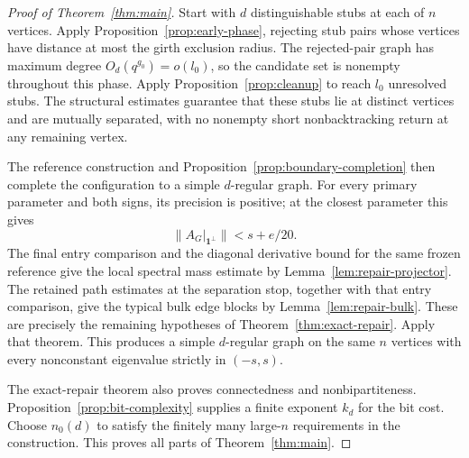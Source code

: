 \begin{proof}[Proof of Theorem~\ref{thm:main}]
Start with $d$ distinguishable stubs at each of $n$ vertices.  Apply
Proposition~\ref{prop:early-phase}, rejecting stub
pairs whose vertices have distance at most the girth exclusion radius.
The rejected-pair graph has maximum degree $O_d(q^{g_0})=o(l_0)$, so the
candidate set is nonempty throughout this phase.  Apply
Proposition~\ref{prop:cleanup} to reach $l_0$ unresolved stubs.  The structural estimates guarantee that
these stubs lie at distinct vertices and are mutually separated, with
no nonempty short nonbacktracking return at any remaining vertex.

The reference construction and Proposition~\ref{prop:boundary-completion} then complete the
configuration to a simple $d$-regular graph.  For every primary parameter
and both signs, its precision is positive; at the closest parameter this
gives
\[
 \|A_G|_{\mathbf1^\perp}\|<s+e/20.
\]
The final entry comparison and the diagonal derivative bound for the same
frozen reference give the local spectral mass estimate by
Lemma~\ref{lem:repair-projector}.  The retained path estimates at the
separation stop, together with that entry comparison, give the typical
bulk edge blocks by Lemma~\ref{lem:repair-bulk}.  These are precisely the
remaining hypotheses of Theorem~\ref{thm:exact-repair}.  Apply that theorem.  This produces a simple
$d$-regular graph on the same $n$ vertices with every nonconstant
eigenvalue strictly in $(-s,s)$.

The exact-repair theorem also proves connectedness and nonbipartiteness.
Proposition~\ref{prop:bit-complexity} supplies a finite exponent $k_d$
for the bit cost. Choose $n_0(d)$ to satisfy the finitely many
large-$n$ requirements in the construction. This proves all parts of
Theorem~\ref{thm:main}.
\end{proof}
